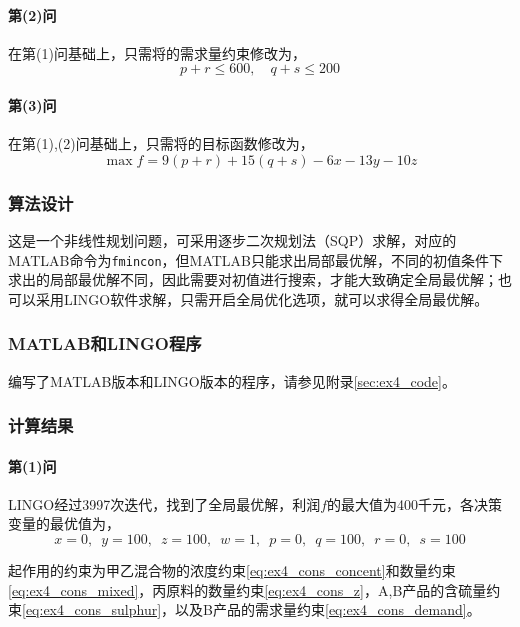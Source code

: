 \documentclass[12pt,a4paper]{article}
\begin{document}
\paragraph{第(2)问} 在第(1)问基础上，只需将的需求量约束修改为，
\begin{equation}
    p + r \le 600, \quad q + s \le 200
\end{equation}

\paragraph{第(3)问} 在第(1),(2)问基础上，只需将的目标函数修改为，
\begin{equation}
    \max f = 9(p+r) + 15(q+s) - 6x - 13y - 10z
\end{equation}

\subsubsection{算法设计}

这是一个非线性规划问题，可采用逐步二次规划法（SQP）求解，对应的MATLAB命令为\texttt{fmincon}，但MATLAB只能求出局部最优解，不同的初值条件下求出的局部最优解不同，因此需要对初值进行搜索，才能大致确定全局最优解；也可以采用LINGO软件求解，只需开启全局优化选项，就可以求得全局最优解。

\subsubsection{MATLAB和LINGO程序}

编写了MATLAB版本和LINGO版本的程序，请参见附录\ref{sec:ex4_code}。

\subsubsection{计算结果}

\paragraph{第(1)问} LINGO经过3997次迭代，找到了全局最优解，利润$f$的最大值为400千元，各决策变量的最优值为，
\begin{equation}
    x=0, \enspace y=100, \enspace z=100, \enspace w=1, \enspace p=0, \enspace q=100, \enspace r=0, \enspace s=100
\end{equation}

起作用的约束为甲乙混合物的浓度约束\ref{eq:ex4_cons_concent}和数量约束\ref{eq:ex4_cons_mixed}，丙原料的数量约束\ref{eq:ex4_cons_z}，A,B产品的含硫量约束\ref{eq:ex4_cons_sulphur}，以及B产品的需求量约束\ref{eq:ex4_cons_demand}。
\end{document}
